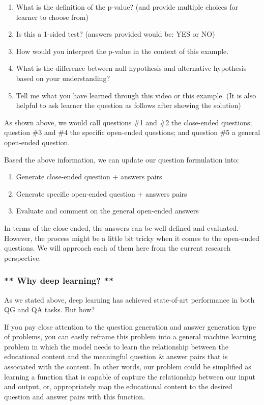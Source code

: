 \documentclass[]{book}
\theoremstyle{definition}
\theoremstyle{definition}
\theoremstyle{definition}
\theoremstyle{remark}
\begin{document}
\begin{enumerate}
\def\labelenumi{\arabic{enumi}.}
\item
  What is the definition of the p-value? (and provide multiple choices
  for learner to choose from)
\item
  Is this a 1-sided test? (answers provided would be: YES or NO)
\item
  How would you interpret the p-value in the context of this example.
\item
  What is the difference between null hypothesis and alternative
  hypothesis based on your understanding?
\item
  Tell me what you have learned through this video or this example. (It
  is also helpful to ask learner the question as follows after showing
  the solution)
\end{enumerate}

As shown above, we would call questions \#1 and \#2 the close-ended
questions; question \#3 and \#4 the specific open-ended questions; and
question \#5 a general open-ended question.

Based the above information, we can update our question formulation
into:

\begin{enumerate}
\def\labelenumi{\arabic{enumi}.}
\item
  Generate close-ended question + answers pairs
\item
  Generate specific open-ended question + answers pairs
\item
  Evaluate and comment on the general open-ended answers
\end{enumerate}

In terms of the close-ended, the answers can be well defined and
evaluated. However, the process might be a little bit tricky when it
comes to the open-ended questions. We will approach each of them here
from the current research perspective.

\subsubsection{** Why deep learning? **}\label{why-deep-learning}

As we stated above, deep learning has achieved state-of-art performance
in both QG and QA tasks. But how?

If you pay close attention to the question generation and answer
generation type of problems, you can easily reframe this problem into a
general machine learning problem in which the model needs to learn the
relationship between the educational content and the meaningful question
\& answer pairs that is associated with the content. In other words, our
problem could be simplified as learning a function that is capable of
capture the relationship between our input and output, or, appropriately
map the educational content to the desired question and answer pairs
with this function.
\end{document}
